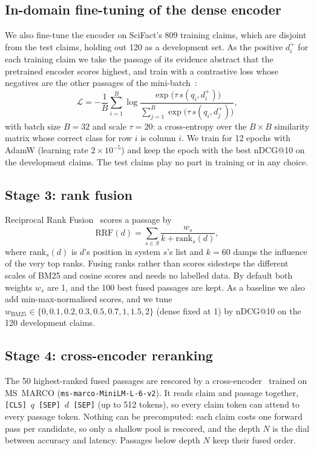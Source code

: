 \documentclass[runningheads]{llncs}
\begin{document}
\subsection{In-domain fine-tuning of the dense encoder}
We also fine-tune the encoder on SciFact's 809 training claims, which are
disjoint from the test claims, holding out 120 as a development set. As the
positive $d_i^{+}$ for each training claim we take the passage of its evidence
abstract that the pretrained encoder scores highest, and train with a contrastive
loss whose negatives are the other passages of the mini-batch~\cite{karpukhin2020dpr}:
\begin{equation}
\mathcal{L}=-\frac{1}{B}\sum_{i=1}^{B}
\log\frac{\exp\!\big(\tau\,s(q_i,d_i^{+})\big)}
{\sum_{j=1}^{B}\exp\!\big(\tau\,s(q_i,d_j^{+})\big)},
\end{equation}
with batch size $B=32$ and scale $\tau=20$: a cross-entropy over the $B\times B$
similarity matrix whose correct class for row $i$ is column $i$. We train for 12
epochs with AdamW (learning rate $2\times10^{-5}$) and keep the epoch with the best
nDCG@10 on the development claims. The test claims play no part in training or in
any choice.

\subsection{Stage 3: rank fusion}
Reciprocal Rank Fusion~\cite{cormack2009rrf} scores a passage by
\begin{equation}
\mathrm{RRF}(d)=\sum_{s \in S} \frac{w_s}{k + \mathrm{rank}_s(d)},
\label{eq:rrf}
\end{equation}
where $\mathrm{rank}_s(d)$ is $d$'s position in system $s$'s list and $k=60$ damps
the influence of the very top ranks. Fusing ranks rather than scores sidesteps
the different scales of BM25 and cosine scores and needs no labelled data. By
default both weights $w_s$ are 1, and the 100 best fused passages are kept. As a
baseline we also add min-max-normalised scores, and we tune
$w_{\mathrm{BM25}}\in\{0,0.1,0.2,0.3,0.5,0.7,1,1.5,2\}$ (dense fixed at 1) by
nDCG@10 on the 120 development claims.

\subsection{Stage 4: cross-encoder reranking}
The 50 highest-ranked fused passages are rescored by a
cross-encoder~\cite{nogueira2019passage} trained on MS~MARCO
(\texttt{ms-marco-MiniLM-L-6-v2}). It reads claim and passage together,
\texttt{[CLS]}~$q$~\texttt{[SEP]}~$d$~\texttt{[SEP]} (up to 512 tokens), so every
claim token can attend to every passage token. Nothing can be precomputed: each
claim costs one forward pass per candidate, so only a shallow pool is rescored,
and the depth $N$ is the dial between accuracy and latency. Passages below depth
$N$ keep their fused order.
\end{document}
